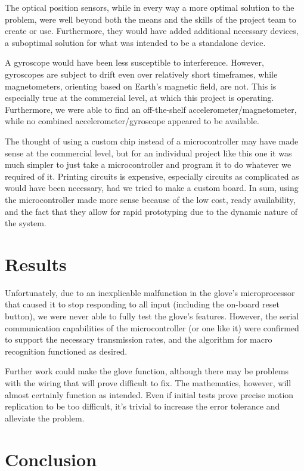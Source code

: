 \documentclass{article}
\begin{document}
	The optical position sensors, while in every way a more optimal solution to the problem, were well beyond both the means and the skills of the project team to create or use. Furthermore, they would have added additional necessary devices, a suboptimal solution for what was intended to be a standalone device.
	
	A gyroscope would have been less susceptible to interference. However, gyroscopes are subject to drift even over relatively short timeframes, while magnetometers, orienting based on Earth's magnetic field, are not. This is especially true at the commercial level, at which this project is operating. Furthermore, we were able to find an off-the-shelf accelerometer/magnetometer, while no combined accelerometer/gyroscope appeared to be available.
	
	The thought of using a custom chip instead of a microcontroller may have made sense at the commercial level, but for an individual project like this one it was much simpler to just take a microcontroller and program it to do whatever we required of it. Printing circuits is expensive, especially circuits as complicated as would have been necessary, had we tried to make a custom board. In sum, using the microcontroller made more sense because of the low cost, ready availability, and the fact that they allow for rapid prototyping due to the dynamic nature of the system.
	
	
	\section{Results}
	
	
	Unfortunately, due to an inexplicable malfunction in the glove's microprocessor that caused it to stop responding to all input (including the on-board reset button), we were never able to fully test the glove's features. However, the serial communication capabilities of the microcontroller (or one like it) were confirmed to support the necessary transmission rates, and the algorithm for macro recognition functioned as desired.
	
	Further work could make the glove function, although there may be problems with the wiring that will prove difficult to fix. The mathematics, however, will almost certainly function as intended. Even if initial tests prove precise motion replication to be too difficult, it's trivial to increase the error tolerance and alleviate the problem.
	
	\section{Conclusion}
	
\end{document}
